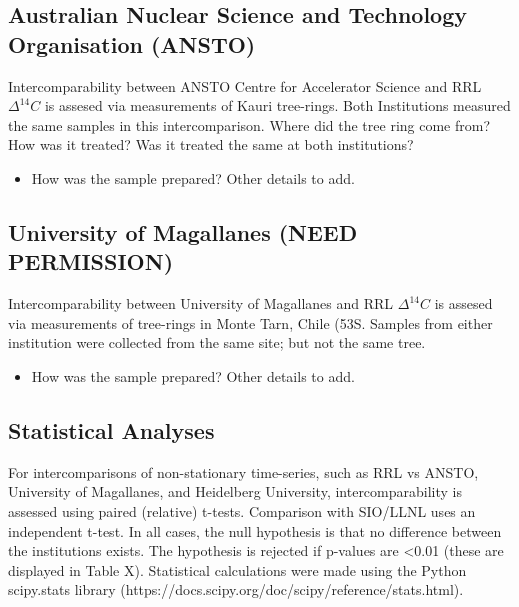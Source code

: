 \documentclass{article}
\begin{document}
\subsection{Australian Nuclear Science and Technology Organisation (ANSTO)}

Intercomparability between ANSTO Centre for Accelerator Science and RRL ${\Delta^{14}C}$ is assesed via measurements of Kauri tree-rings. Both Institutions measured the same samples in this intercomparison.   
Where did the tree ring come from? 
How was it treated? Was it treated the same at both institutions? 





\begin{itemize}
	\item How was the sample prepared? Other details to add. 
\end{itemize}

\subsection{University of Magallanes (NEED PERMISSION)}
  
Intercomparability between University of Magallanes and RRL ${\Delta^{14}C}$ is assesed via measurements of tree-rings in Monte Tarn, Chile (53S. Samples from either institution were collected from the same site; but not the same tree. 
\begin{itemize}
	\item How was the sample prepared? Other details to add. 
\end{itemize}


\subsection{Statistical Analyses}
For intercomparisons of non-stationary time-series, such as RRL vs ANSTO, University of Magallanes, and Heidelberg University, intercomparability is assessed using paired (relative) t-tests. Comparison with SIO/LLNL uses an independent t-test. In all cases, the null hypothesis is that no difference between the institutions exists. The hypothesis is rejected if p-values are <0.01 (these are displayed in Table X). Statistical calculations were made using the Python scipy.stats library (https://docs.scipy.org/doc/scipy/reference/stats.html).
\end{document}
